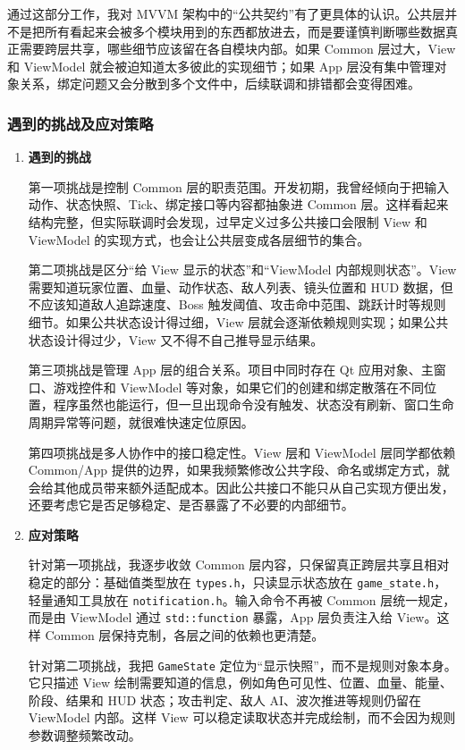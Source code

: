 \documentclass[a4paper]{article}
\begin{document}
通过这部分工作，我对 MVVM 架构中的“公共契约”有了更具体的认识。公共层并不是把所有看起来会被多个模块用到的东西都放进去，而是要谨慎判断哪些数据真正需要跨层共享，哪些细节应该留在各自模块内部。如果 Common 层过大，View 和 ViewModel 就会被迫知道太多彼此的实现细节；如果 App 层没有集中管理对象关系，绑定问题又会分散到多个文件中，后续联调和排错都会变得困难。

\subsubsection{遇到的挑战及应对策略}

\begin{enumerate}
  \item \textbf{遇到的挑战}

    第一项挑战是控制 Common 层的职责范围。开发初期，我曾经倾向于把输入动作、状态快照、Tick、绑定接口等内容都抽象进 Common 层。这样看起来结构完整，但实际联调时会发现，过早定义过多公共接口会限制 View 和 ViewModel 的实现方式，也会让公共层变成各层细节的集合。

    第二项挑战是区分“给 View 显示的状态”和“ViewModel 内部规则状态”。View 需要知道玩家位置、血量、动作状态、敌人列表、镜头位置和 HUD 数据，但不应该知道敌人追踪速度、Boss 触发阈值、攻击命中范围、跳跃计时等规则细节。如果公共状态设计得过细，View 层就会逐渐依赖规则实现；如果公共状态设计得过少，View 又不得不自己推导显示结果。

    第三项挑战是管理 App 层的组合关系。项目中同时存在 Qt 应用对象、主窗口、游戏控件和 ViewModel 等对象，如果它们的创建和绑定散落在不同位置，程序虽然也能运行，但一旦出现命令没有触发、状态没有刷新、窗口生命周期异常等问题，就很难快速定位原因。

    第四项挑战是多人协作中的接口稳定性。View 层和 ViewModel 层同学都依赖 Common/App 提供的边界，如果我频繁修改公共字段、命名或绑定方式，就会给其他成员带来额外适配成本。因此公共接口不能只从自己实现方便出发，还要考虑它是否足够稳定、是否暴露了不必要的内部细节。

  \item \textbf{应对策略}

    针对第一项挑战，我逐步收敛 Common 层内容，只保留真正跨层共享且相对稳定的部分：基础值类型放在 \texttt{types.h}，只读显示状态放在 \texttt{game\_state.h}，轻量通知工具放在 \texttt{notification.h}。输入命令不再被 Common 层统一规定，而是由 ViewModel 通过 \texttt{std::function} 暴露，App 层负责注入给 View。这样 Common 层保持克制，各层之间的依赖也更清楚。

    针对第二项挑战，我把 \texttt{GameState} 定位为“显示快照”，而不是规则对象本身。它只描述 View 绘制需要知道的信息，例如角色可见性、位置、血量、能量、阶段、结果和 HUD 状态；攻击判定、敌人 AI、波次推进等规则仍留在 ViewModel 内部。这样 View 可以稳定读取状态并完成绘制，而不会因为规则参数调整频繁改动。


\end{enumerate}
\end{document}
